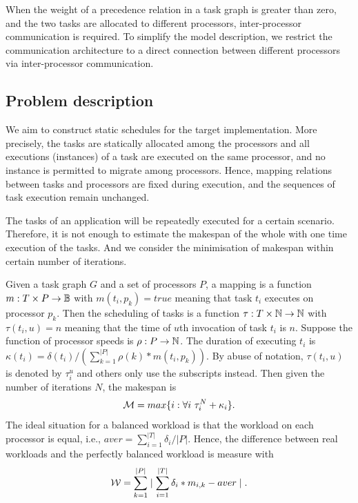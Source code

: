 When the weight of a precedence relation in a task graph is greater than zero, and the two tasks are allocated to different processors, inter-processor communication is required. To simplify the model description, we restrict the communication architecture to a direct connection between different processors via inter-processor communication.

\vspace{-8pt}
\subsection{Problem description}

We aim to construct static schedules for the target implementation. 
More precisely, the
tasks are statically allocated among the processors and
all executions (instances) of a task are executed on the same
processor, and no instance is permitted to migrate among
processors. Hence, mapping relations between tasks and processors are fixed during execution, and the sequences of task execution remain unchanged.

The tasks of an application will be repeatedly executed for a certain scenario.
Therefore, it is not enough to estimate the makespan of the whole with one time execution of the tasks. 
And we consider the minimisation of makespan within certain number of iterations. 


Given a task graph $G$ and a set of processors $P$, a mapping is a function $m: T \times P\rightarrow \mathbb{B}$ with $m(t_i,p_k)=true$ meaning that task $t_i$ executes on processor $p_k$. 
Then the scheduling of tasks is a function $\tau: T\times \mathbb{N} \rightarrow \mathbb{N}$ with $\tau(t_i,u)=n$ meaning that the time of $u$th invocation of task $t_i$ is $n$. Suppose the function of processor speeds is $\rho: P\rightarrow \mathbb{N}$. The duration of executing $t_i$ is $\kappa(t_i)=\delta(t_i)/(\sum^{|P|}_{k=1}\rho(k)*m(t_i,p_k))$. By abuse of notation, $\tau(t_i,u)$ is denoted by $\tau^u_i$ and others only use the subscripts instead. Then given the number of iterations $N$, the makespan is 
$${\cal{M}}=max \{i : \forall i ~\tau^N_i + \kappa_i\}.$$ 
The ideal situation for a balanced workload is that the workload on each processor is equal, i.e., 
$aver= \sum^{|T|}_{i=1} \delta_i /|P|$. 
Hence, the difference between real workloads and the perfectly balanced workload is measure with $${\cal{W}}=\sum^{|P|}_{k=1} \mid\sum^{|T|}_{i=1}\delta_i*m_{i,k}- aver\mid.$$

